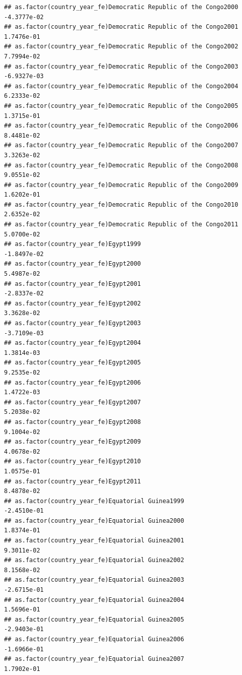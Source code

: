 \documentclass[
  a4paper,
]{article}
\begin{document}
\begin{verbatim}
## as.factor(country_year_fe)Democratic Republic of the Congo2000 -4.3777e-02
## as.factor(country_year_fe)Democratic Republic of the Congo2001  1.7476e-01
## as.factor(country_year_fe)Democratic Republic of the Congo2002  7.7994e-02
## as.factor(country_year_fe)Democratic Republic of the Congo2003 -6.9327e-03
## as.factor(country_year_fe)Democratic Republic of the Congo2004  6.2333e-02
## as.factor(country_year_fe)Democratic Republic of the Congo2005  1.3715e-01
## as.factor(country_year_fe)Democratic Republic of the Congo2006  8.4481e-02
## as.factor(country_year_fe)Democratic Republic of the Congo2007  3.3263e-02
## as.factor(country_year_fe)Democratic Republic of the Congo2008  9.0551e-02
## as.factor(country_year_fe)Democratic Republic of the Congo2009  1.6202e-01
## as.factor(country_year_fe)Democratic Republic of the Congo2010  2.6352e-02
## as.factor(country_year_fe)Democratic Republic of the Congo2011  5.0700e-02
## as.factor(country_year_fe)Egypt1999                            -1.8497e-02
## as.factor(country_year_fe)Egypt2000                             5.4987e-02
## as.factor(country_year_fe)Egypt2001                            -2.8337e-02
## as.factor(country_year_fe)Egypt2002                             3.3628e-02
## as.factor(country_year_fe)Egypt2003                            -3.7109e-03
## as.factor(country_year_fe)Egypt2004                             1.3814e-03
## as.factor(country_year_fe)Egypt2005                             9.2535e-02
## as.factor(country_year_fe)Egypt2006                             1.4722e-03
## as.factor(country_year_fe)Egypt2007                             5.2038e-02
## as.factor(country_year_fe)Egypt2008                             9.1004e-02
## as.factor(country_year_fe)Egypt2009                             4.0678e-02
## as.factor(country_year_fe)Egypt2010                             1.0575e-01
## as.factor(country_year_fe)Egypt2011                             8.4878e-02
## as.factor(country_year_fe)Equatorial Guinea1999                -2.4510e-01
## as.factor(country_year_fe)Equatorial Guinea2000                 1.8374e-01
## as.factor(country_year_fe)Equatorial Guinea2001                 9.3011e-02
## as.factor(country_year_fe)Equatorial Guinea2002                 8.1568e-02
## as.factor(country_year_fe)Equatorial Guinea2003                -2.6715e-01
## as.factor(country_year_fe)Equatorial Guinea2004                 1.5696e-01
## as.factor(country_year_fe)Equatorial Guinea2005                -2.9403e-01
## as.factor(country_year_fe)Equatorial Guinea2006                -1.6966e-01
## as.factor(country_year_fe)Equatorial Guinea2007                 1.7902e-01

\end{verbatim}
\end{document}
